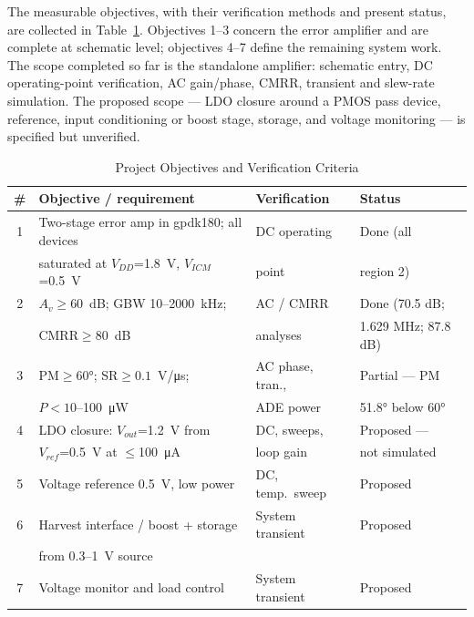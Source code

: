 \documentclass[conference]{IEEEtran}
\begin{document}
The measurable objectives, with their verification methods and present
status, are collected in Table~\ref{tab:obj}. Objectives 1--3 concern the
error amplifier and are complete at schematic level; objectives 4--7 define
the remaining system work. The scope completed so far is the standalone
amplifier: schematic entry, DC operating-point verification, AC gain/phase,
CMRR, transient and slew-rate simulation. The proposed scope --- LDO closure
around a PMOS pass device, reference, input conditioning or boost stage,
storage, and voltage monitoring --- is specified but unverified.

\begin{table}[!t]
\caption{Project Objectives and Verification Criteria}
\label{tab:obj}
\centering\footnotesize
\begin{tabular}{@{}clll@{}}
\toprule
\# & Objective / requirement & Verification & Status \\
\midrule
1 & Two-stage error amp in gpdk180; all devices & DC operating & Done (all \\
  & saturated at $V_{DD}$=\SI{1.8}{\volt}, $V_{ICM}$=\SI{0.5}{\volt} & point & region 2) \\
2 & $A_v{\ge}60$~dB; GBW 10--2000~kHz; & AC / CMRR & Done (70.5 dB; \\
  & CMRR${\ge}80$~dB & analyses & 1.629 MHz; 87.8 dB) \\
3 & PM${\ge}$\ang{60}; SR${\ge}0.1$~V/\si{\micro\second}; & AC phase, tran., & Partial --- PM \\
  & $P{<}10$--100~\si{\micro\watt} & ADE power & \ang{51.8} below \ang{60} \\
4 & LDO closure: $V_{out}$=\SI{1.2}{\volt} from & DC, sweeps, & Proposed --- \\
  & $V_{ref}$=\SI{0.5}{\volt} at $\le$\SI{100}{\micro\ampere} & loop gain & not simulated \\
5 & Voltage reference \SI{0.5}{\volt}, low power & DC, temp.\ sweep & Proposed \\
6 & Harvest interface / boost + storage & System transient & Proposed \\
  & from 0.3--1~\si{\volt} source & & \\
7 & Voltage monitor and load control & System transient & Proposed \\
\bottomrule
\end{tabular}
\end{table}
\end{document}
